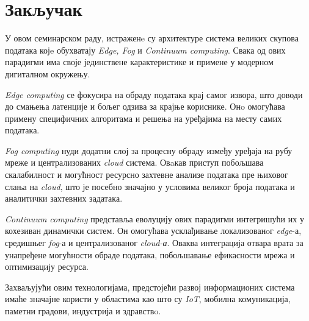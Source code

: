 \section{Закључак}
 
У овом семинарском раду, истраженe су архитектуре система великих скупова података којe обухватају \textit{Edge, Fog} и \textit{Continuum computing}. Свака од ових парадигми има своје јединствене карактеристике и примене у модерном дигиталном окружењу.

\textit{Edge computing} се фокусира на обраду података крај самог извора, што доводи до смањења латенције и бољег одзива за крајње кориснике. Онo омогућава примену специфичних алгоритама и решења на уређајима на месту самих података.

\textit{Fog computing} нуди додатни слој за процесну обраду између уређаја на рубу мреже и централизованих \textit{cloud} система. Овaкав приступ побољшава скалабилност и могућност ресурсно захтевне анализе података пре њиховог слања на \textit{cloud}, што је посебно значајно у условима великог броја података и аналитички захтевних задатака.

\textit{Continuum computing} представља еволуцију ових парадигми интегришући их у кохезиван динамички систем. Он омогућава усклађивање локализованoг \textit{edge}-а, средишњег \textit{fog}-а и централизованог \textit{cloud-а}. Оваква интеграција отвара врата за унапређене могућности обраде података, побољшавање ефикасности мрежа и оптимизацију ресурса.

Захваљујући овим технологијама, предстојећи развој информационих система имаће значајне користи у областима као што су \textit{IoT}, мобилна комуникација, паметни градови, индустрија и здравствo.